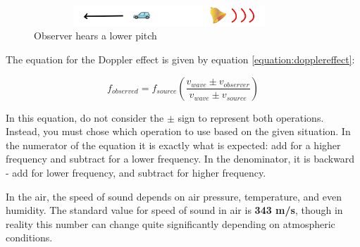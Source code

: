	
				
	\begin{figure}[!h]
		\centering
		\includegraphics[height=0.3in,width=4in]{Chapters/Ch10-Waves/Doppler4.png}
		\caption{Observer hears a lower pitch}
	\end{figure}
	
	

	
	The equation for the Doppler effect is given by equation \ref{equation:dopplereffect}:
	
	

	
	
	
		\begin{mdframed}[backgroundcolor=orange!20!white]
		\begin{equation}
		f_{observed} = f_{source}(\frac{v_{wave} \pm v_{observer}}{v_{wave} \pm v_{source}})
		\label{equation:dopplereffect}
		\end{equation}
	\end{mdframed}	
	
		

	
	In this equation, do not consider the $\pm$ sign to represent both operations.  Instead, you must chose which operation to use based on the given situation.  In the numerator of the equation it is exactly what is expected: add for a higher frequency and subtract for a lower frequency.  In the denominator, it is backward - add for lower frequency, and subtract for higher frequency.  
	
	
	
	In the air, the speed of sound depends on air pressure, temperature, and even humidity.  The standard value for speed of sound in air is \textbf{343 m/s}, though in reality this number can change quite significantly depending on atmospheric conditions.  
	
		\newpage
	
	
	
	
	
